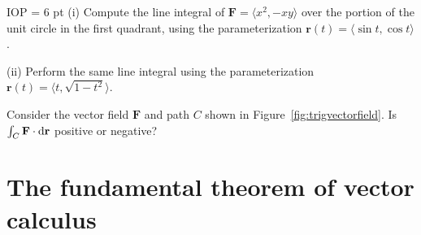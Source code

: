 \documentclass[prettycode,shellescape]{watsonbook}
\begin{document}
\begin{exercise}{}{IOP} \parskip = 6 pt
  (i) Compute the line integral of
  $\mathbf{F} = \langle x^2,-xy\rangle$ over the portion of the unit
  circle in the first quadrant, using the parameterization
  $\mathbf{r}(t) = \langle \sin t, \cos t \rangle$. 

  (ii) Perform the same line integral using the parameterization
  $\mathbf{r}(t) = \langle t, \sqrt{1-t^2} \rangle$.
\end{exercise}

\begin{exercise}{}{}
  Consider the vector field $\mathbf{F}$ and path $C$ shown in
  Figure~\ref{fig:trigvectorfield}. Is
  $\int_C \mathbf{F} \cdot \mathrm{d}\mathbf{r}$ positive or negative?
\end{exercise}

\section{The fundamental theorem of vector calculus} \label{sec:line_integrals}

\end{document}
